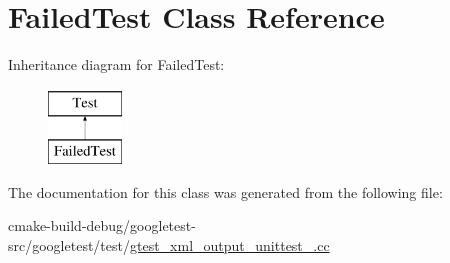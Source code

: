 \hypertarget{classFailedTest}{}\section{Failed\+Test Class Reference}
\label{classFailedTest}
Inheritance diagram for Failed\+Test\+:\begin{figure}[H]
\begin{center}
\leavevmode
\includegraphics[height=2.000000cm]{classFailedTest}
\end{center}
\end{figure}


The documentation for this class was generated from the following file\+:\begin{DoxyCompactItemize}
\item 
cmake-\/build-\/debug/googletest-\/src/googletest/test/\mbox{\hyperlink{gtest__xml__output__unittest___8cc}{gtest\+\_\+xml\+\_\+output\+\_\+unittest\+\_\+.\+cc}}\end{DoxyCompactItemize}
